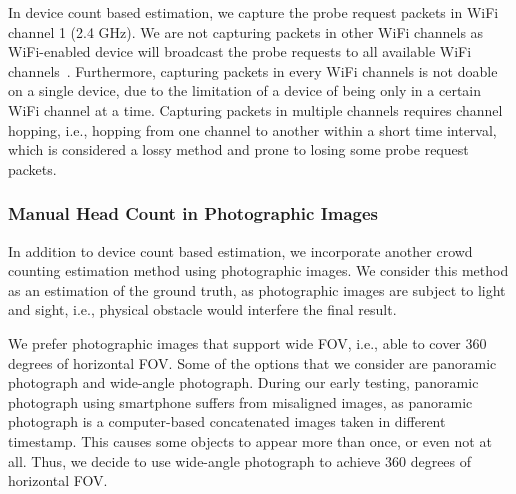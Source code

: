 	In device count based estimation, we capture the probe request packets in WiFi channel 1 (2.4 GHz). We are not capturing packets in other WiFi channels as WiFi-enabled device will broadcast the probe requests to all available WiFi channels~\cite{thesis082}. Furthermore, capturing packets in every WiFi channels is not doable on a single device, due to the limitation of a device of being only in a certain WiFi channel at a time. Capturing packets in multiple channels requires channel hopping, i.e., hopping from one channel to another within a short time interval, which is considered a lossy method and prone to losing some probe request packets.
	

	\subsubsection{Manual Head Count in Photographic Images} %
	\label{ssub:manual_counting_using_photo}
	In addition to device count based estimation, we incorporate another crowd counting estimation method using photographic images. We consider this method as an estimation of the ground truth, as photographic images are subject to light and sight, i.e., physical obstacle would interfere the final result.
	
	We prefer photographic images that support wide \ac{FOV}, i.e., able to cover 360 degrees of horizontal \ac{FOV}. Some of the options that we consider are panoramic photograph and wide-angle photograph. During our early testing, panoramic photograph using smartphone suffers from misaligned images, as panoramic photograph is a computer-based concatenated images taken in different timestamp. This causes some objects to appear more than once, or even not at all. Thus, we decide to use wide-angle photograph to achieve 360 degrees of horizontal \ac{FOV}.

